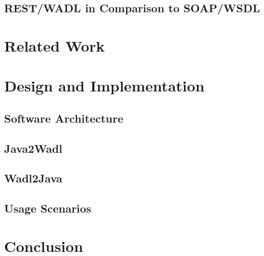 \documentclass[a4paper,11pt]{article}
\begin{document}
\subsection{REST/WADL in Comparison to SOAP/WSDL}

\section{Related Work}

\section{Design and Implementation}

\subsection{Software Architecture}

\subsection{Java2Wadl}

\subsection{Wadl2Java}

\subsection{Usage Scenarios}

\section{Conclusion}

\newpage


\end{document}
